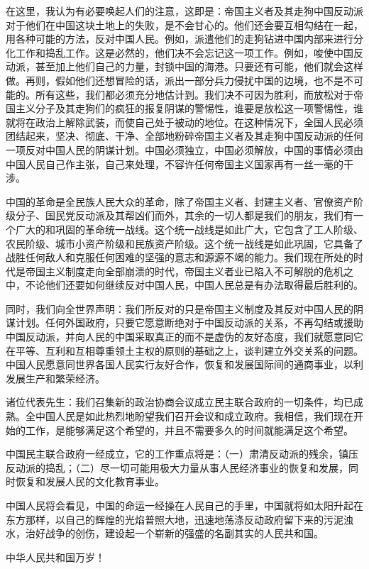 在这里，我认为有必要唤起人们的注意，这即是：帝国主义者及其走狗中国反动派对于他们在中国这块土地上的失败，是不会甘心的。他们还会要互相勾结在一起，用各种可能的方法，反对中国人民。例如，派遣他们的走狗钻进中国内部来进行分化工作和捣乱工作。这是必然的，他们决不会忘记这一项工作。例如，唆使中国反动派，甚至加上他们自己的力量，封锁中国的海港。只要还有可能，他们就会这样做。再则，假如他们还想冒险的话，派出一部分兵力侵扰中国的边境，也不是不可能的。所有这些，我们都必须充分地估计到。我们决不可因为胜利，而放松对于帝国主义分子及其走狗们的疯狂的报复阴谋的警惕性，谁要是放松这一项警惕性，谁就将在政治上解除武装，而使自己处于被动的地位。在这种情况下，全国人民必须团结起来，坚决、彻底、干净、全部地粉碎帝国主义者及其走狗中国反动派的任何一项反对中国人民的阴谋计划。中国必须独立，中国必须解放，中国的事情必须由中国人民自己作主张，自己来处理，不容许任何帝国主义国家再有一丝一毫的干涉。

中国的革命是全民族人民大众的革命，除了帝国主义者、封建主义者、官僚资产阶级分子、国民党反动派及其帮凶们而外，其余的一切人都是我们的朋友，我们有一个广大的和巩固的革命统一战线。这个统一战线是如此广大，它包含了工人阶级、农民阶级、城市小资产阶级和民族资产阶级。这个统一战线是如此巩固，它具备了战胜任何敌人和克服任何困难的坚强的意志和源源不竭的能力。我们现在所处的时代是帝国主义制度走向全部崩溃的时代，帝国主义者业已陷入不可解脱的危机之中，不论他们还要如何继续反对中国人民，中国人民总是有办法取得最后胜利的。

同时，我们向全世界声明：我们所反对的只是帝国主义制度及其反对中国人民的阴谋计划。任何外国政府，只要它愿意断绝对于中国反动派的关系，不再勾结或援助中国反动派，并向人民的中国采取真正的而不是虚伪的友好态度，我们就愿意同它在平等、互利和互相尊重领土主权的原则的基础之上，谈判建立外交关系的问题。中国人民愿意同世界各国人民实行友好合作，恢复和发展国际间的通商事业，以利发展生产和繁荣经济。

诸位代表先生：我们召集新的政治协商会议成立民主联合政府的一切条件，均已成熟。全中国人民是如此热烈地盼望我们召开会议和成立政府。我相信，我们现在开始的工作，是能够满足这个希望的，并且不需要多久的时间就能满足这个希望。

中国民主联合政府一经成立，它的工作重点将是：（一）肃清反动派的残余，镇压反动派的捣乱；（二）尽一切可能用极大力量从事人民经济事业的恢复和发展，同时恢复和发展人民的文化教育事业。

中国人民将会看见，中国的命运一经操在人民自己的手里，中国就将如太阳升起在东方那样，以自己的辉煌的光焰普照大地，迅速地荡涤反动政府留下来的污泥浊水，治好战争的创伤，建设起一个崭新的强盛的名副其实的人民共和国。

中华人民共和国万岁！

